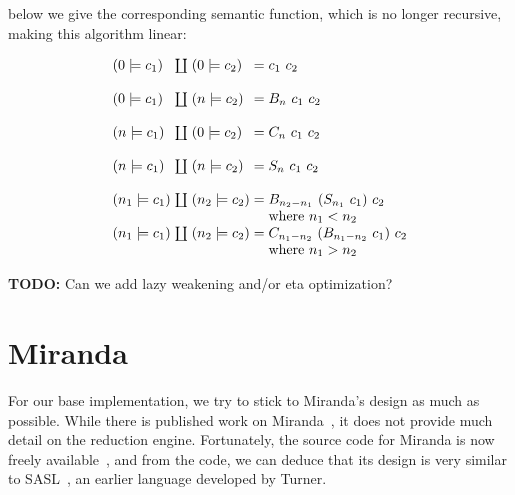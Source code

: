 \documentclass[conference]{IEEEtran}
\begin{document}
below we give the corresponding semantic function, which is no longer recursive, making this algorithm linear:

\begin{equation*}
    \arraycolsep=1.4pt
    \begin{array}{l l l l l}
        (0 \models c_1)   & \coprod & (0 \models c_2)   & = & c_1 \ c_2                               \\
        \\
        (0 \models c_1)   & \coprod & (n \models c_2)   & = & B_n \ c_1 \ c_2                         \\
        \\
        (n \models c_1)   & \coprod & (0 \models c_2)   & = & C_n \ c_1 \ c_2                         \\
        \\
        (n \models c_1)   & \coprod & (n \models c_2)   & = & S_n \ c_1 \ c_2                         \\
        \\
        (n_1 \models c_1) & \coprod & (n_2 \models c_2) & = & B_{n_2-n_1} \ (S_{n_1} \ c_1) \ c_2     \\
                          &         &                   &   & \text{where } n_1 < n_2                 \\
        (n_1 \models c_1) & \coprod & (n_2 \models c_2) & = & C_{n_1-n_2} \ (B_{n_1-n_2} \ c_1) \ c_2 \\
                          &         &                   &   & \text{where } n_1 > n_2                 \\
    \end{array}
\end{equation*}

\textbf{TODO: } Can we add lazy weakening and/or eta optimization?

\section{Miranda}
\label{sec:miranda}
For our base implementation, we try to stick to Miranda's design as much as possible.
While there is published work on Miranda~\cite{turner_miranda_1985}, it does not provide much detail on the reduction engine.
Fortunately, the source code for Miranda is now freely available~\cite{turner_open_2021}, and from the code, we can deduce that its design is very similar to SASL~\cite{turner_new_1979}, an earlier language developed by Turner.
\end{document}
